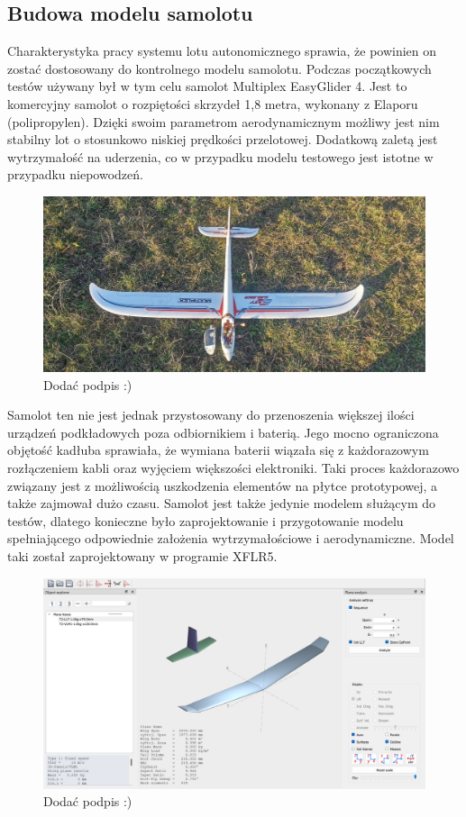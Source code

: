 \documentclass[12pt, a4paper]{article}
\begin{document}
\subsection{Budowa modelu samolotu}
Charakterystyka pracy systemu lotu autonomicznego sprawia, że powinien  on zostać dostosowany do kontrolnego modelu samolotu. Podczas początkowych testów używany był w tym celu samolot Multiplex EasyGlider 4. Jest to komercyjny samolot o rozpiętości skrzydeł 1,8 metra, wykonany z Elaporu (polipropylen). Dzięki swoim parametrom aerodynamicznym możliwy jest nim stabilny lot o stosunkowo niskiej prędkości przelotowej. Dodatkową zaletą jest wytrzymałość na uderzenia, co w przypadku modelu testowego jest istotne w przypadku niepowodzeń.
\begin{figure}[ht]
    \centering
    \includegraphics[width=1\textwidth]{budowa1}
    \caption{Dodać podpis :)}
\end{figure}
Samolot ten nie jest jednak przystosowany do przenoszenia większej ilości urządzeń podkładowych poza odbiornikiem i baterią. Jego mocno ograniczona objętość kadłuba sprawiała, że wymiana baterii wiązała się z każdorazowym rozłączeniem kabli oraz wyjęciem większości elektroniki. Taki proces każdorazowo związany jest z możliwością uszkodzenia elementów na płytce prototypowej, a także zajmował dużo czasu. Samolot jest także jedynie modelem służącym do testów, dlatego konieczne było zaprojektowanie i przygotowanie modelu spełniającego odpowiednie założenia wytrzymałościowe i aerodynamiczne. Model taki został zaprojektowany w programie XFLR5.
 \begin{figure}[ht]
    \centering
    \includegraphics[width=1\textwidth]{xflr}
    \caption{Dodać podpis :)}
\end{figure}
\end{document}
